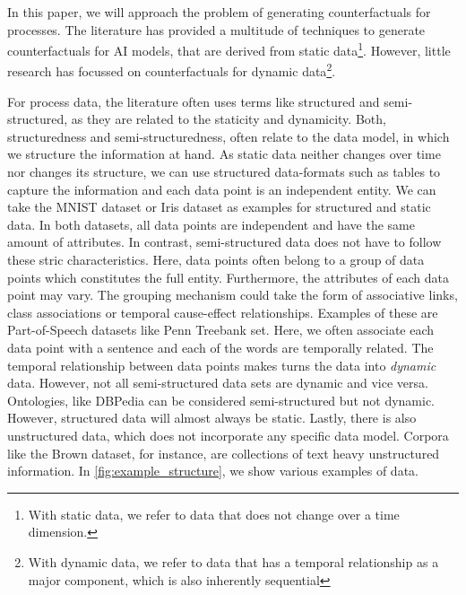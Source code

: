 \documentclass[./../../paper.tex]{subfiles}
\begin{document}
In this paper, we will approach the problem of generating counterfactuals for processes. The literature has provided a multitude of techniques to generate counterfactuals for AI models, that are derived from static data\footnote{With static data, we refer to data that does not change over a time dimension.}. However, little research has focussed on counterfactuals for dynamic data\footnote{With dynamic data, we refer to data that has a temporal relationship as a major component, which is also inherently sequential}.  

For process data, the literature often uses terms like structured and semi-structured, as they are related to the staticity and dynamicity. Both, structuredness and semi-structuredness, often relate to the data model, in which we structure the information at hand. As static data neither changes over time nor changes its structure, we can use structured data-formats such as tables to capture the information and each data point is an independent entity. We can take the MNIST dataset\needscite{} or Iris dataset\needscite{} as examples for structured and static data. In both datasets, all data points are independent and have the same amount of attributes. In contrast, semi-structured data does not have to follow these stric characteristics. Here, data points often belong to a group of data points which constitutes the full entity. Furthermore, the attributes of each data point may vary. The grouping mechanism could take the form of associative links, class associations or temporal cause-effect relationships. Examples of these are Part-of-Speech datasets like Penn Treebank set\needscite{}. Here, we often associate each data point with a sentence and each of the words are temporally related. The temporal relationship between data points makes turns the data into \emph{dynamic} data. However, not all semi-structured data sets are dynamic and vice versa. Ontologies, like DBPedia\needscite{} can be considered semi-structured but not dynamic. However, structured data will almost always be static. Lastly, there is also unstructured data, which does not incorporate any specific data model. Corpora like the Brown dataset\needscite{}, for instance, are collections of text heavy unstructured information. In \autoref{fig:example_structure}, we show various examples of data.

\end{document}
